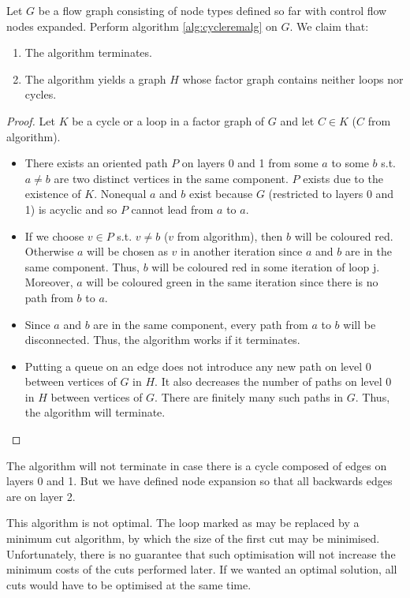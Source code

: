   Let $G$ be a flow graph consisting of node types defined so far with control flow nodes expanded. Perform algorithm \ref{alg:cycleremalg} on $G$. We claim that:
  \begin{enumerate}
    \item The algorithm terminates.
    \item The algorithm yields a graph $H$ whose factor graph contains neither loops nor cycles.
  \end{enumerate}
  \begin{proof}
    Let $K$ be a cycle or a loop in a factor graph of $G$ and let $C \in K$ ($C$ from algorithm).
    \begin{itemize}
      \item There exists an oriented path $P$ on layers 0 and 1 from some $a$ to some $b$ s.t. $a \neq b$ are two distinct vertices in the same component. $P$ exists due to the existence of $K$. Nonequal $a$ and $b$ exist because $G$ (restricted to layers 0 and 1) is acyclic and so $P$ cannot lead from $a$ to $a$. 
      \item If we choose $v \in P$ s.t. $v \neq b$ ($v$ from algorithm), then $b$ will be coloured red. Otherwise $a$ will be chosen as $v$ in another iteration since $a$ and $b$ are in the same component. Thus, $b$ will be coloured red in some iteration of loop j.  Moreover, $a$ will be coloured green in the same iteration since there is no path from $b$ to $a$.
      \item Since $a$ and $b$ are in the same component, every path from $a$ to $b$ will be disconnected. Thus, the algorithm works if it terminates. 
  \item Putting a queue on an edge does not introduce any new path on level 0 between vertices of $G$ in $H$. It also decreases the number of paths on level 0 in $H$ between vertices of $G$. There are finitely many such paths in $G$. Thus, the algorithm will terminate.
    \end{itemize}
  \end{proof}
\myendclaim

\begin{rem}
  The algorithm will not terminate in case there is a cycle composed of edges on layers 0 and 1. But we have defined node expansion so that all backwards edges are on layer 2.
\end{rem}

This algorithm is not optimal. The loop marked as  may be replaced by a minimum cut algorithm, by which the size of the first cut may be minimised. Unfortunately, there is no guarantee that such optimisation will not increase the minimum costs of the cuts performed later. If we wanted an optimal solution, all cuts would have to be optimised at the same time. 


